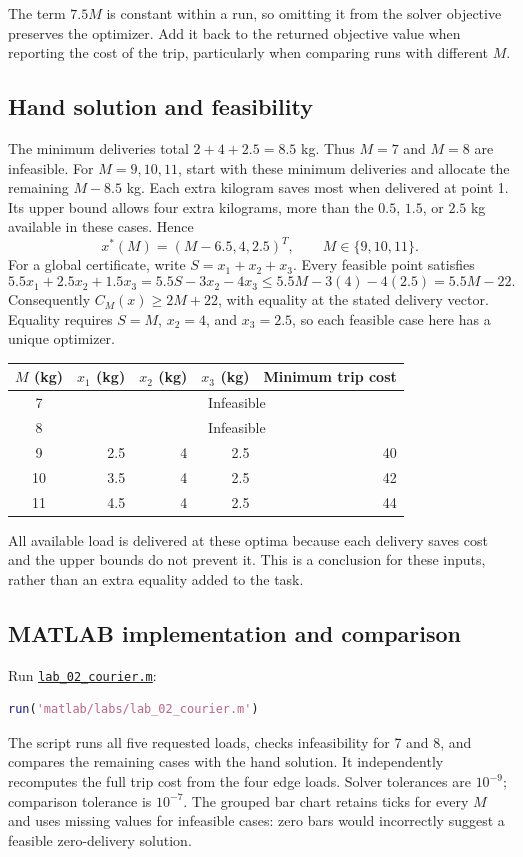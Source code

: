 \documentclass[11pt,a4paper]{article}
\begin{document}
The term $7.5M$ is constant within a run, so omitting it from the solver
objective preserves the optimizer. Add it back to the returned objective
value when reporting the cost of the trip, particularly when comparing runs
with different $M$.

\subsection{Hand solution and feasibility}
The minimum deliveries total $2+4+2.5=8.5$ kg. Thus $M=7$ and $M=8$
are infeasible. For $M=9,10,11$, start with these minimum deliveries and
allocate the remaining $M-8.5$ kg. Each extra kilogram saves most when
delivered at point 1. Its upper bound allows four extra kilograms, more
than the $0.5$, $1.5$, or $2.5$ kg available in these cases. Hence
\[
  x^*(M)=(M-6.5,4,2.5)^T,\qquad M\in\{9,10,11\}.
\]
For a global certificate, write $S=x_1+x_2+x_3$. Every feasible point satisfies
\[
  5.5x_1+2.5x_2+1.5x_3
  =5.5S-3x_2-4x_3\leq5.5M-3(4)-4(2.5)=5.5M-22.
\]
Consequently $C_M(x)\geq2M+22$, with equality at the stated delivery vector.
Equality requires $S=M$, $x_2=4$, and $x_3=2.5$, so each feasible case here
has a unique optimizer.
\begin{center}
  \begin{tabular}{crrrr}\toprule
    $M$ (kg) & $x_1$ (kg) & $x_2$ (kg) & $x_3$ (kg) & Minimum trip cost\\\midrule
    7 & \multicolumn{4}{c}{Infeasible}\\
    8 & \multicolumn{4}{c}{Infeasible}\\
    9 & 2.5 & 4 & 2.5 & 40\\
    10 & 3.5 & 4 & 2.5 & 42\\
    11 & 4.5 & 4 & 2.5 & 44\\\bottomrule
  \end{tabular}
\end{center}
All available load is delivered at these optima because each delivery saves
cost and the upper bounds do not prevent it. This is a conclusion for these
inputs, rather than an extra equality added to the task.

\subsection{MATLAB implementation and comparison}
Run \href{run:matlab/labs/lab_02_courier.m}{\texttt{lab\_02\_courier.m}}:
\begin{lstlisting}[language=Matlab]
run('matlab/labs/lab_02_courier.m')
\end{lstlisting}
The script runs all five requested loads, checks infeasibility for 7 and 8,
and compares the remaining cases with the hand solution. It independently
recomputes the full trip cost from the four edge loads. Solver tolerances are
$10^{-9}$; comparison tolerance is $10^{-7}$. The grouped bar chart retains
ticks for every $M$ and uses missing values for infeasible cases: zero bars
would incorrectly suggest a feasible zero-delivery solution.
\end{document}
